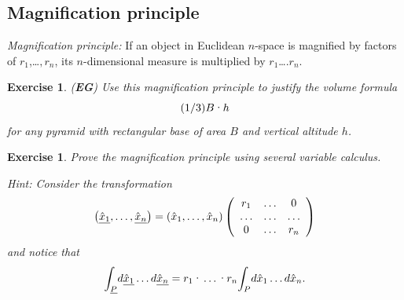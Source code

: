 \documentclass{article}%
\newtheorem{exercise}[theorem]{Exercise}
\begin{document}
\subsection{Magnification principle}

\textit{Magnification principle:} If an object in Euclidean $n$-space is
magnified by factors of $r_{1}$,\ldots$,r_{n}$, its $n$-dimensional measure is
multiplied by $r_{1}$\textperiodcentered\ldots$.r_{n}$.

\begin{exercise}
(\textbf{EG}) Use this magnification principle to justify the volume formula%
\[
(1/3)B\text{\textperiodcentered}h
\]
for any pyramid with rectangular base of area $B$ and vertical altitude $h$.
\end{exercise}

\begin{exercise}
Prove the magnification principle using several variable calculus.

Hint: Consider the transformation%
\[
\left(  \underline{\hat{x}_{1}},\ldots,\underline{\hat{x}_{n}}\right)
=\left(  \hat{x}_{1},\ldots,\hat{x}_{n}\right)  \left(
\begin{array}
[c]{ccc}%
r_{1} & \ldots & 0\\
\ldots & \ldots & \ldots\\
0 & \ldots & r_{n}%
\end{array}
\right)
\]
and notice that%
\[%
{\displaystyle\int\nolimits_{\underline{P}}}
d\underline{\hat{x}_{1}}\ldots d\underline{\hat{x}_{n}}=r_{1}%
\text{\textperiodcentered}\ldots\text{\textperiodcentered}r_{n}%
{\displaystyle\int\nolimits_{P}}
d\hat{x}_{1}\ldots d\hat{x}_{n}.
\]

\end{exercise}
\end{document}
